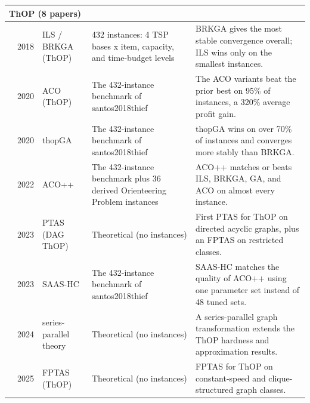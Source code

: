 \begin{center}
\begin{tabular}{@{}p{2.8cm}cp{3.0cm}p{4.9cm}p{7.9cm}@{}}
\midrule
\multicolumn{5}{l}{\textbf{ThOP} (8 papers)} \\ \midrule
\citet{santos2018thief} & 2018 & ILS / BRKGA (ThOP) & 432 instances: 4 TSP bases x item, capacity, and time-budget levels & BRKGA gives the most stable convergence overall; ILS wins only on the smallest instances. \\
\citet{chagas2020ants} & 2020 & ACO (ThOP) & The 432-instance benchmark of santos2018thief & The ACO variants beat the prior best on 95\% of instances, a 320\% average profit gain. \\
\citet{faeda2020genetic} & 2020 & thopGA & The 432-instance benchmark of santos2018thief & thopGA wins on over 70\% of instances and converges more stably than BRKGA. \\
\citet{chagas2022efficiently} & 2022 & ACO++ & The 432-instance benchmark plus 36 derived Orienteering Problem instances & ACO++ matches or beats ILS, BRKGA, GA, and ACO on almost every instance. \\
\citet{bloch2023polynomial} & 2023 & PTAS (DAG ThOP) & Theoretical (no instances) & First PTAS for ThOP on directed acyclic graphs, plus an FPTAS on restricted classes. \\
\citet{huynh2023self} & 2023 & SAAS-HC & The 432-instance benchmark of santos2018thief & SAAS-HC matches the quality of ACO++ using one parameter set instead of 48 tuned sets. \\
\citet{bloch2024thief} & 2024 & series-parallel theory & Theoretical (no instances) & A series-parallel graph transformation extends the ThOP hardness and approximation results. \\
\citet{bloch2025algorithms} & 2025 & FPTAS (ThOP) & Theoretical (no instances) & FPTAS for ThOP on constant-speed and clique-structured graph classes. \\
\bottomrule
\end{tabular}
\end{center}
